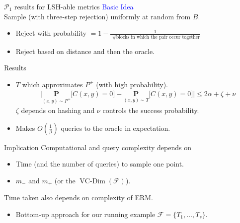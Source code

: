 \documentclass{beamer}
\newcommand{\mc}{\mathcal}
\newcommand{\mb}{\mathbf}
\DeclareMathOperator*{\vcdim}{VC-Dim}
\def\checkmark{\tikz\fill[scale=0.4](0,.35) -- (.25,0) -- (1,.7) -- (.25,.15) -- cycle;}
\begin{document}
\begin{frame}{$\mc P_1$ results for LSH-able metrics}
	\textcolor{blue}{Basic Idea}\\
	Sample (with three-step rejection) uniformly at random from $B$.
	\begin{itemize}
		\vspace{5pt}\item Reject with probability $= 1 - \frac{1}{\text{ \#blocks in which the pair occur together}}$
		\vspace{5pt}\item Reject based on distance and then the oracle.
	\end{itemize} 
	
	\begin{block}{Results}
		\begin{itemize}
			\item $T$ which approximates $P^+$ (with high probability).
			\begin{align*}
  &\Big|\underset{(x, y) \sim P^+}{\mb P} \big[ C(x, y) = 0 ] -\underset{(x, y) \sim T}{\mb P} \big[ C(x, y) = 0 ] \Big| \le 2\alpha + \zeta  + \nu
  			\end{align*} 
			$\zeta$ depends on hashing and $\nu$ controls the success probability. 
			\vspace{10pt}\item Makes $O(\frac{1}{\beta})$ queries to the oracle in expectation. 
		\end{itemize}			
	\end{block}
\end{frame}

\begin{frame}{Implication}
	Computational and query complexity depends on
	\begin{itemize}
		\vspace{10pt}\item[{\color{green}\checkmark}] Time (and the number of queries) to  sample one point. 
		\vspace{5pt}\item $m_-$ and $m_+$ (or the \alert{$\vcdim(\mc F)$}). 
	\end{itemize}		

	\vspace{30pt}Time taken also depends on complexity of ERM.
	\begin{itemize}
		\vspace{10pt}\item[{\color{green}\checkmark}] Bottom-up approach for our running example $\mc F = \{T_1, \ldots, T_s\}$.
	\end{itemize}		
\end{frame}
\end{document}

